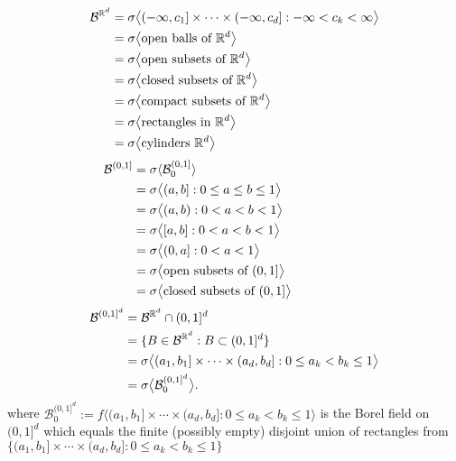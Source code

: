 \begin{theorem}\label{eqvgens}
\begin{align*}
\mathcal B^{\Bbb R^d}
& = \sigma\bigl\langle (-\infty,c_1]\times \cdots \times (-\infty, c_d]: -\infty < c_k< \infty \bigr\rangle    \\
& = \sigma\bigl\langle \text{open balls of $\Bbb R^d$}  \bigr\rangle  \\
& = \sigma\bigl\langle \text{open subsets of $\Bbb R^d$}  \bigr\rangle  \\
& = \sigma\bigl\langle \text{closed subsets of $\Bbb R^d$}  \bigr\rangle\\
& = \sigma\bigl\langle \text{compact subsets of $\Bbb R^d$}  \bigr\rangle \\
& = \sigma\bigl\langle \text{rectangles in $\Bbb R^d$}  \bigr\rangle \\
& = \sigma\bigl\langle \text{cylinders $\Bbb R^d$}  \bigr\rangle
\end{align*}
\begin{align*}
\mathcal B^{(0,1]}
&=\sigma\langle \mathcal B_0^{(0,1]}\rangle \hphantom{asdfdddddddasdfasdfasdfasdf}\\
&= \sigma\bigl\langle (a,b]: 0\leq a \leq b \leq 1 \bigr\rangle \\
  & =\sigma\bigl\langle (a,b): 0< a < b <1  \bigr\rangle \\
  & =\sigma\bigl\langle [a,b]: 0< a < b <1  \bigr\rangle \\
    & =\sigma\bigl\langle (0,a]: 0< a  <1  \bigr\rangle \\
& = \sigma\bigl\langle \text{open subsets of $(0,1]$}  \bigr\rangle  \\
& = \sigma\bigl\langle \text{closed subsets of $(0,1]$}  \bigr\rangle
\end{align*}
\begin{align*}
\mathcal B^{(0,1]^d}
& = \mathcal B^{\Bbb R^d}\cap (0,1]^d \\
& = \{B\in\mathcal B^{\Bbb R^d}: B\subset (0,1]^d  \} \\
&=  \sigma\bigl \langle (a_1,b_1]\times\cdots\times (a_d,b_d] : 0\leq a_k<b_k\leq 1 \bigr\rangle \\
& = \sigma\bigl\langle  \mathcal B_0^{(0,1]^d}  \bigr\rangle.
\end{align*}
where $\mathcal B_0^{(0,1]^d}:= f\bigl \langle (a_1,b_1]\times\cdots\times (a_d,b_d] : 0\leq a_k< b_k\leq 1 \bigr\rangle$ is the Borel field on $(0,1]^d$ which equals the finite (possibly empty) disjoint union of rectangles from $\{(a_1,b_1]\times\cdots\times (a_d,b_d] : 0\leq a_k< b_k\leq1  \}$

\end{theorem}

